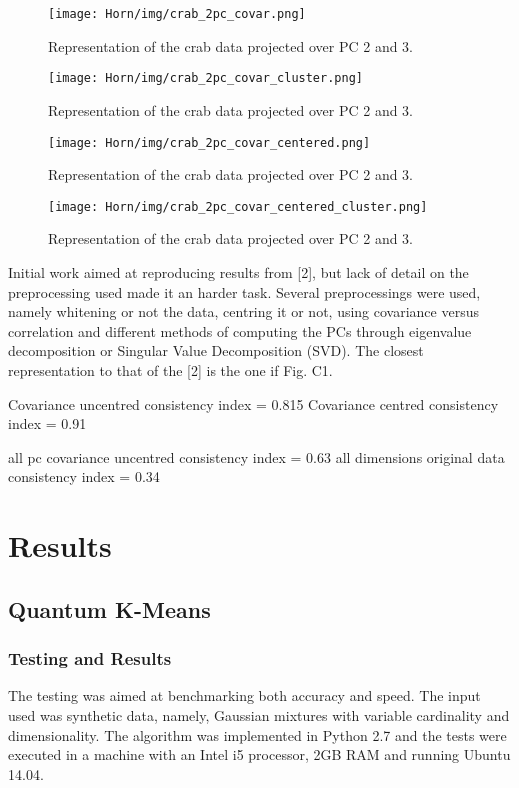 \begin{figure}[hbtp]
\centering
\texttt{[image: Horn/img/crab\_2pc\_covar.png]}
\caption{Representation of the crab data projected over PC 2 and 3.}
\label{fig:crab_2pc_covar}
\end{figure}

\begin{figure}[hbtp]
\centering
\texttt{[image: Horn/img/crab\_2pc\_covar\_cluster.png]}
\caption{Representation of the crab data projected over PC 2 and 3.}
\label{fig:crab_2pc_covar_cluster}
\end{figure}

\begin{figure}[hbtp]
\centering
\texttt{[image: Horn/img/crab\_2pc\_covar\_centered.png]}
\caption{Representation of the crab data projected over PC 2 and 3.}
\label{fig:crab_2pc_covar_centered}
\end{figure}

\begin{figure}[hbtp]
\centering
\texttt{[image: Horn/img/crab\_2pc\_covar\_centered\_cluster.png]}
\caption{Representation of the crab data projected over PC 2 and 3.}
\label{fig:crab_2pc_covar_centered_cluster}
\end{figure}


Initial work aimed at reproducing results from [2], but lack of detail on the preprocessing used made it an harder task. Several preprocessings were used, namely whitening or not the data, centring it or not, using covariance versus correlation and different methods of computing the PCs through eigenvalue decomposition or Singular Value Decomposition (SVD). The closest representation to that of the [2] is the one if Fig. C1.




Covariance uncentred consistency index = 0.815
Covariance centred consistency index = 0.91

all pc covariance uncentred consistency index = 0.63
all dimensions original data consistency index = 0.34
\section{Results}
\subsection{Quantum K-Means}
\subsubsection{Testing and Results}
The testing was aimed at benchmarking both accuracy and speed. The input used was synthetic data, namely, Gaussian mixtures with variable cardinality and dimensionality. The algorithm was implemented in Python 2.7 and the tests were executed in a machine with an Intel i5 processor, 2GB RAM and running Ubuntu 14.04.

